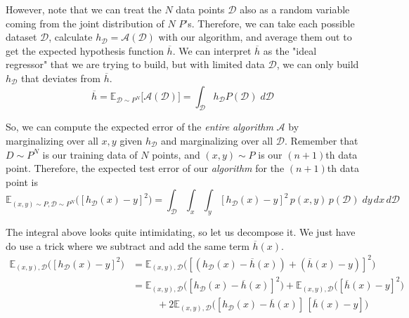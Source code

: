   However, note that we can treat the $N$ data points $\mathcal{D}$ also as a random variable coming from the joint distribution of $N$ $P$'s. Therefore, we can take each possible dataset $\mathcal{D}$, calculate $h_\mathcal{D} = \mathcal{A}(\mathcal{D})$ with our algorithm, and average them out to get the expected hypothesis function $\overline{h}$. We can interpret $\overline{h}$ as the "ideal regressor" that we are trying to build, but with limited data $\mathcal{D}$, we can only build $h_\mathcal{D}$ that deviates from $\overline{h}$.
  \begin{equation}
    \overline{h} = \mathbb{E}_{\mathcal{D} \sim P^N} \big[ \mathcal{A}(\mathcal{D}) \big] = \int_\mathcal{D} h_\mathcal{D} P(\mathcal{D})\; d\mathcal{D}
  \end{equation}

  So, we can compute the expected error of the \textit{entire algorithm} $\mathcal{A}$ by marginalizing over all $x, y$ given $h_\mathcal{D}$ and marginalizing over all $\mathcal{D}$. Remember that $D \sim P^N$ is our training data of $N$ points, and $(x, y) \sim P$ is our $(n+1)$th data point. Therefore, the expected test error of our \textit{algorithm} for the $(n+1)$th data point is
  \begin{equation}
    \mathbb{E}_{(x, y) \sim P, \mathcal{D} \sim P^N} \big( [ h_\mathcal{D} (x) - y]^2 \big) = \int_\mathcal{D} \int_x \int_y [ h_\mathcal{D} (x) - y]^2\, p(x, y) \, p(\mathcal{D})\; dy\,dx\,d\mathcal{D}
  \end{equation}

  The integral above looks quite intimidating, so let us decompose it. We just have do use a trick where we subtract and add the same term $\overline{h}(x)$.
  \begin{align*}
    \mathbb{E}_{(x, y), \mathcal{D}} \big( [ h_\mathcal{D} (x) - y]^2 \big) & = \mathbb{E}_{(x, y), \mathcal{D}} \big( [ (h_\mathcal{D} (x) - \overline{h}(x)) + (\overline{h}(x) - y)]^2 \big) \\
    & = \mathbb{E}_{(x, y), \mathcal{D}} \big( [h_\mathcal{D} (x) - \overline{h} (x)]^2 \big) + 
    \mathbb{E}_{(x, y), \mathcal{D}} \big( [\overline{h} (x) - y]^2 \big) \\
    & \;\;\;\;\;\;\;\;\; + 2 \mathbb{E}_{(x, y), \mathcal{D}} \big([h_\mathcal{D} (x) - \overline{h} (x)]\,[\overline{h} (x) - y] \big)
  \end{align*}

